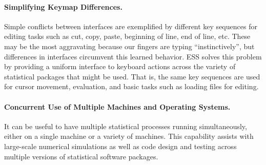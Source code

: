 \documentclass{article}
\newcommand{\stexttt}[1]{{\small\texttt{#1}}}
\begin{document}




\paragraph{Simplifying Keymap Differences.}
Simple conflicts between interfaces are exemplified by different key
sequences for editing tasks such as cut, copy, paste, beginning of
line, end of line, etc.  These may be the most aggravating because our
fingers are typing ``instinctively'', but differences in interfaces
circumvent this learned behavior.  ESS solves this problem by
providing a uniform interface to keyboard actions across the variety
of statistical packages that might be used.  That is, the same key
sequences are used for cursor movement, evaluation, and basic tasks
such as loading files for editing.

\paragraph{Concurrent Use of Multiple Machines and Operating Systems.}
It can be useful to have multiple statistical processes running
simultaneously, either on a single machine or a variety of machines.
This capability assists with large-scale numerical simulations as well
as code design and testing across multiple versions of statistical
software packages.
\end{document}
